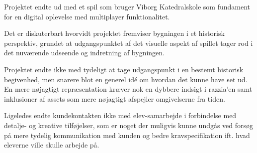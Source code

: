 Projektet endte ud med et spil som bruger Viborg Katedralskole som fundament for en digital oplevelse med multiplayer funktionalitet. 

Det er diskuterbart hvorvidt projektet fremviser bygningen i et historisk perspektiv, grundet at udgangspunktet af det visuelle aspekt af spillet tager rod i det nuværende udseende og indretning af bygningen. 

Projektet endte ikke med tydeligt at tage udgangspunkt i en bestemt historisk begivenhed, men snarere blot en generel idé om hvordan det kunne have set ud. En mere nøjagtigt repræsentation kræver nok en dybbere indsigt i razzia'en samt inklusioner af assets som mere nøjagtigt afspejler omgivelserne fra tiden. 

Ligeledes endte kundekontakten ikke med elev-samarbejde i forbindelse med detalje- og kreative tilføjelser, som er noget der muligvis kunne undgås ved forsøg på mere tydelig kommunikation med kunden og bedre kravspecifikation ift. hvad eleverne ville skulle arbejde på. 


